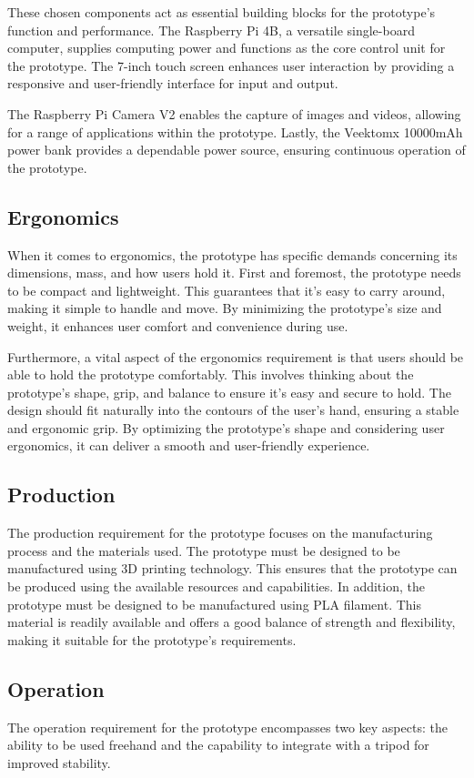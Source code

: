 These chosen components act as essential building blocks for the prototype's function and performance. The Raspberry Pi 4B, a versatile single-board computer, supplies computing power and functions as the core control unit for the prototype. The 7-inch touch screen enhances user interaction by providing a responsive and user-friendly interface for input and output.

The Raspberry Pi Camera V2 enables the capture of images and videos, allowing for a range of applications within the prototype. Lastly, the Veektomx 10000mAh power bank provides a dependable power source, ensuring continuous operation of the prototype.

\subsection{Ergonomics}
When it comes to ergonomics, the prototype has specific demands concerning its dimensions, mass, and how users hold it. First and foremost, the prototype needs to be compact and lightweight. This guarantees that it's easy to carry around, making it simple to handle and move. By minimizing the prototype's size and weight, it enhances user comfort and convenience during use.

Furthermore, a vital aspect of the ergonomics requirement is that users should be able to hold the prototype comfortably. This involves thinking about the prototype's shape, grip, and balance to ensure it's easy and secure to hold. The design should fit naturally into the contours of the user's hand, ensuring a stable and ergonomic grip. By optimizing the prototype's shape and considering user ergonomics, it can deliver a smooth and user-friendly experience.

\subsection{Production}
The production requirement for the prototype focuses on the manufacturing process and the materials used. The prototype must be designed to be manufactured using 3D printing technology. This ensures that the prototype can be produced using the available resources and capabilities. In addition, the prototype must be designed to be manufactured using PLA filament. This material is readily available and offers a good balance of strength and flexibility, making it suitable for the prototype's requirements.

\subsection{Operation}
The operation requirement for the prototype encompasses two key aspects: the ability to be used freehand and the capability to integrate with a tripod for improved stability.

